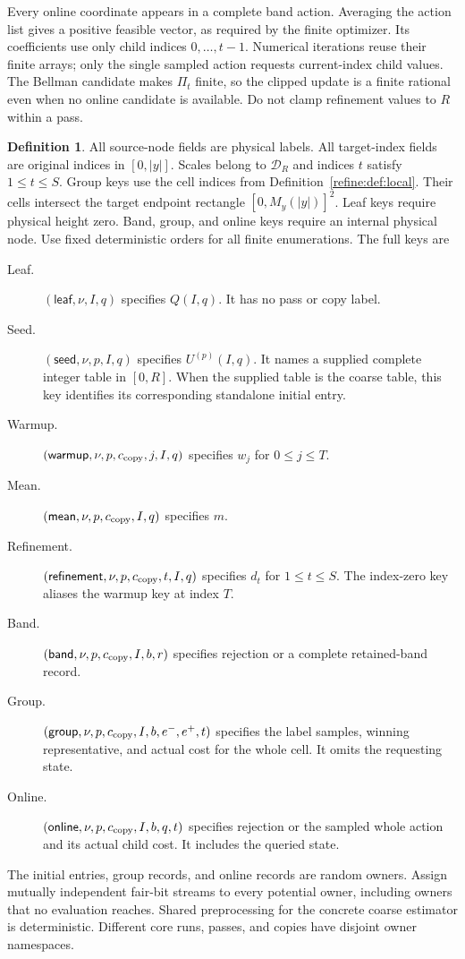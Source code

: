 \documentclass[11pt]{article}
\theoremstyle{definition}
\newtheorem{definition}[theorem]{Definition}
\newcommand{\1}{\mathbf 1}
\begin{document}
Every online coordinate appears in a complete band action. Averaging
the action list gives a positive feasible vector, as required by the
finite optimizer. Its coefficients use only child
indices $0,\ldots,t-1$. Numerical iterations reuse their finite arrays;
only the single sampled action requests current-index child values.
The Bellman candidate makes $\Pi_t$ finite, so the clipped update is a
finite rational even when no online candidate is available. Do not
clamp refinement values to $R$ within a pass.

\begin{definition}\label{refine:def:keys}
All source-node fields are physical labels. All target-index fields are
original indices in $[0,|y|]$. Scales belong to $\mathcal D_R$ and
indices $t$ satisfy $1\le t\le S$. Group keys use the cell indices from Definition~\ref{refine:def:local}.
Their cells intersect the target endpoint rectangle $[0,M_y(|y|)]^2$.
Leaf keys require physical height zero. Band, group, and online keys
require an internal physical node. Use fixed deterministic orders for
all finite enumerations.
The full keys are
\begin{description}
\item[Leaf.] $(\mathsf{leaf},\nu,I,q)$ specifies $Q(I,q)$.
It has no pass or copy label.
\item[Seed.] $(\mathsf{seed},\nu,p,I,q)$ specifies $U^{(p)}(I,q)$.
It names a supplied complete integer table in $[0,R]$.
When the supplied table is the coarse table, this key identifies its
corresponding standalone initial entry.
\item[Warmup.] $(\mathsf{warmup},\nu,p,c_{\rm copy},j,I,q)$
specifies $w_j$ for $0\le j\le T$.
\item[Mean.] $(\mathsf{mean},\nu,p,c_{\rm copy},I,q)$ specifies $m$.
\item[Refinement.] $(\mathsf{refinement},\nu,p,c_{\rm copy},t,I,q)$
specifies $d_t$ for $1\le t\le S$.
The index-zero key aliases the warmup key at index $T$.
\item[Band.] $(\mathsf{band},\nu,p,c_{\rm copy},I,b,r)$ specifies
rejection or a complete retained-band record.
\item[Group.] $(\mathsf{group},\nu,p,c_{\rm copy},I,b,e^-,e^+,t)$
specifies the label samples, winning representative, and actual cost
for the whole cell. It omits the requesting state.
\item[Online.] $(\mathsf{online},\nu,p,c_{\rm copy},I,b,q,t)$
specifies rejection or the sampled whole action and its actual child cost.
It includes the queried state.
\end{description}
The initial entries, group records, and online records are random owners.
Assign mutually independent fair-bit streams to every potential
owner, including owners that no evaluation reaches. Shared preprocessing for
the concrete coarse estimator is deterministic. Different core runs,
passes, and copies have disjoint owner namespaces.
\end{definition}
\end{document}
